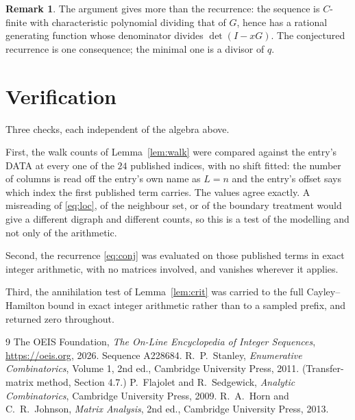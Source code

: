 \documentclass[11pt,a4paper]{article}
\theoremstyle{plain}
\theoremstyle{definition}
\newtheorem{remark}[theorem]{Remark}
\begin{document}
\begin{remark}
The argument gives more than the recurrence: the sequence is $C$-finite with characteristic
polynomial dividing that of $G$, hence has a rational generating function whose denominator
divides $\det(I-xG)$. The conjectured recurrence is one consequence; the minimal one is a
divisor of $q$.
\end{remark}

\section{Verification}

Three checks, each independent of the algebra above.

First, the walk counts of Lemma~\ref{lem:walk} were compared against the entry's DATA at
every one of the $24$ published indices, with no shift fitted: the number of columns is
read off the entry's own name as $L=n$ and the entry's offset says which index the first
published term carries. The values agree exactly. A misreading of \eqref{eq:loc}, of the
neighbour set, or of the boundary treatment would give a different digraph and different
counts, so this is a test of the modelling and not only of the arithmetic.

Second, the recurrence \eqref{eq:conj} was evaluated on those published terms in exact
integer arithmetic, with no matrices involved, and vanishes wherever it applies.

Third, the annihilation test of Lemma~\ref{lem:crit} was carried to the full
Cayley--Hamilton bound in exact integer arithmetic rather than to a sampled prefix, and
returned zero throughout.

\begin{thebibliography}{9}
 The OEIS Foundation, \emph{The On-Line Encyclopedia of Integer
Sequences}, \url{https://oeis.org}, 2026. Sequence A228684.
 R.~P.~Stanley, \emph{Enumerative Combinatorics}, Volume 1, 2nd ed.,
Cambridge University Press, 2011. (Transfer-matrix method, Section 4.7.)
 P.~Flajolet and R.~Sedgewick, \emph{Analytic Combinatorics}, Cambridge
University Press, 2009.
 R.~A.~Horn and C.~R.~Johnson, \emph{Matrix Analysis}, 2nd ed., Cambridge
University Press, 2013.
\end{thebibliography}
\end{document}
